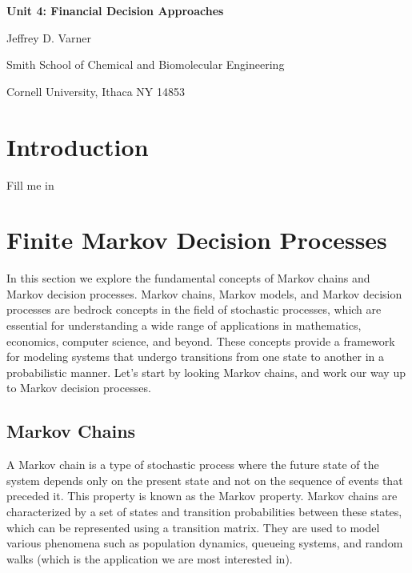 \documentclass[11pt]{article}
\theoremstyle{definition}
\begin{document}
{\par\centering\textbf{\Large Unit 4: Financial Decision Approaches}}
\vspace{0.2in}
{\par \centering \large{Jeffrey D. Varner}}
\vspace{0.05in}
{\par \centering \large{Smith School of Chemical and Biomolecular Engineering}}
{\par \centering \large{Cornell University, Ithaca NY 14853}}

\date{}
\thispagestyle{empty}

\setcounter{page}{1}

\tableofcontents
\clearpage
\listoffigures
\clearpage
\listofalgorithms
\clearpage

\section{Introduction}
Fill me in

\section{Finite Markov Decision Processes}
In this section we explore the fundamental concepts of Markov chains and Markov decision processes.
Markov chains, Markov models, and Markov decision processes are bedrock concepts in the field of stochastic processes, which are essential for understanding a wide range of applications in mathematics, economics, computer science, and beyond. 
These concepts provide a framework for modeling systems that undergo transitions from one state to another in a probabilistic manner.
Let's start by looking Markov chains, and work our way up to Markov decision processes.

\subsection{Markov Chains}
A Markov chain is a type of stochastic process where the future state of the system depends only on the present state and not on the sequence of events that preceded it. 
This property is known as the Markov property. 
Markov chains are characterized by a set of states and transition probabilities between these states, 
which can be represented using a transition matrix. They are used to model various phenomena such as population dynamics, queueing systems, and random walks (which is the application we are most interested in).
\end{document}
